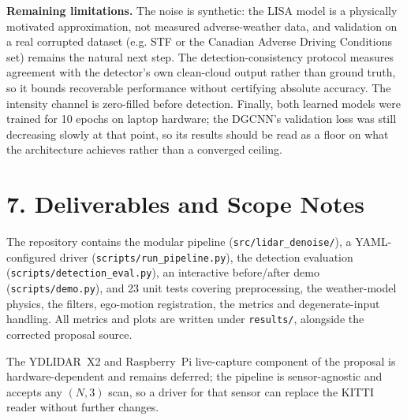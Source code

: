 \documentclass[12pt,a4paper]{article}
\begin{document}
\textbf{Remaining limitations.} The noise is synthetic: the LISA model is
a physically motivated approximation, not measured adverse-weather data,
and validation on a real corrupted dataset (e.g. STF or the Canadian
Adverse Driving Conditions set) remains the natural next step. The
detection-consistency protocol measures agreement with the detector's own
clean-cloud output rather than ground truth, so it bounds recoverable
performance without certifying absolute accuracy. The intensity channel is
zero-filled before detection. Finally, both learned models were trained for
10 epochs on laptop hardware; the DGCNN's validation loss was still
decreasing slowly at that point, so its results should be read as a floor
on what the architecture achieves rather than a converged ceiling.

\section*{7. Deliverables and Scope Notes}

\begin{sloppypar}
The repository contains the modular pipeline
(\texttt{src/lidar\_denoise/}), a YAML-configured driver
(\texttt{scripts/run\_pipeline.py}), the detection evaluation
(\texttt{scripts/detection\_eval.py}), an interactive before/after demo
(\texttt{scripts/demo.py}), and 23 unit tests covering preprocessing,
the weather-model physics, the filters, ego-motion registration, the
metrics and degenerate-input handling. All metrics and plots are written
under \texttt{results/}, alongside the corrected proposal source.
\end{sloppypar}

The YDLIDAR~X2 and Raspberry~Pi live-capture component of the proposal is
hardware-dependent and remains deferred; the pipeline is sensor-agnostic
and accepts any $(N,3)$ scan, so a driver for that sensor can replace the
KITTI reader without further changes.
\end{document}

